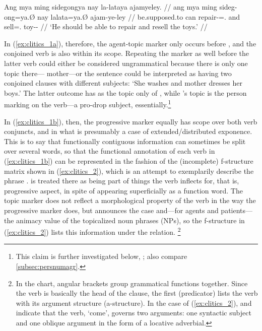 \a\label{ex:clitics_1c}\begingl
	\gla Ang mya ming sidegongya nay la-lataya ajamyeley. //
	\glb ang mya ming sideg-ong=ya.Ø nay la\til{}lata=ya.Ø ajam-ye-ley //
	\glc \AgtT{} be.supposed.to can repair-\Irr{}=\TsgM{}.\Top{} and
		\Iter{}\til{}sell=\TsgM{}.\Top{} toy-\Pl{}-\PargI{} //
	\glft `He should be able to repair and resell the toys.' //
\endgl
\xe

In (\ref{ex:clitics_1a}), therefore, the agent-topic marker 
only occurs before , and the conjoined verb
 is also within its scope.
Repeating the marker as well before the latter verb could either be considered
ungrammatical because there is only one topic there---
{mother}---or the sentence could be interpreted as having two conjoined clauses
with different subjects: `She washes and mother dresses her
boys.' The latter outcome has  as the topic only of
, while 's topic is the person
marking on the verb---a pro-drop subject, essentially.\footnote{This claim is
further investigated below, \pageref{subsubsec:suffixes}; also compare
\autoref{subsec:persnumagr}.}

In (\ref{ex:clitics_1b}), then, the progressive marker 
equally has scope over both verb conjuncts, 
and  in what is presumably a case of
extended/distributed exponence. This is to say that functionally contiguous
information can sometimes be split over several words, so that the functional
annotation of each verb in (\ref{ex:clitics_1b}) can be represented in the
fashion of the (incomplete) f-structure matrix \parencites[see][]
{bresnan2016}{buttking2015} shown in (\ref{ex:clitics_2}), which is an
attempt to exemplarily describe the phrase .  is treated there as being part of things
the verb inflects for, that is, progressive aspect, in spite of appearing
superficially as a function word. The topic marker  does not
reflect a morphological property of the verb in the way the progressive marker
does, but announces the case and---for agents and patients---the animacy value
of the topicalized noun phrases (NPs), so the f-structure in
(\ref{ex:clitics_2}) lists this information under the \Top{} relation.%
\footnote{In the chart, angular brackets group grammatical functions together.
Since the verb is basically the head of the clause, the first \Pred{} 
(predicator) lists the verb with its argument structure (a-structure).
In the case of (\ref{ex:clitics_2}), \ups{\Sbj{}} and  indicate
that the verb, `come', governs two arguments: one syntactic subject and one
oblique argument in the form of a locative adverbial.}

